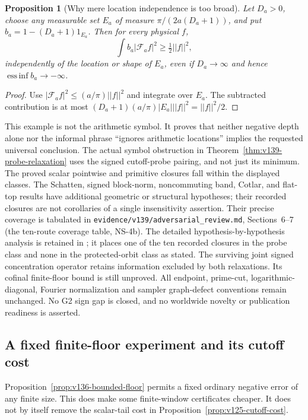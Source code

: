 \documentclass[11pt]{article}
\def\norm#1{||#1||}%
\newtheorem{proposition}[theorem]{Proposition}
\theoremstyle{remark}
\newcommand{\norm}[1]{\left\lVert #1\right\rVert}
\begin{document}
\begin{proposition}[Why mere location independence is too broad]
\label{prop:v139-location-counterexample}
Let $D_a>0$, choose any measurable set $E_a$ of measure
$\pi/(2a(D_a+1))$, and put
$b_a=1-(D_a+1)1_{E_a}$. Then for every physical $f$,
\[
 \int b_a|\mathcal F_af|^2\ge\tfrac12\norm f^2,
\]
independently of the location or shape of $E_a$, even if
$D_a\to\infty$ and hence $\operatorname*{ess\,inf}b_a\to-\infty$.
\end{proposition}
\begin{proof}
Use $|\mathcal F_af|^2\le(a/\pi)\norm f^2$ and integrate over
$E_a$. The subtracted contribution is at most
$(D_a+1)(a/\pi)|E_a|\norm f^2=\norm f^2/2$.
\end{proof}

This example is not the arithmetic symbol. It proves that neither
negative depth alone nor the informal phrase ``ignores arithmetic
locations'' implies the requested universal conclusion. The actual
symbol obstruction in Theorem~\ref{thm:v139-probe-relaxation} uses
the signed cutoff-probe pairing, and not just its minimum.
The proved scalar pointwise and primitive closures fall within the
displayed classes. The Schatten, signed block-norm, noncommuting
band, Cotlar, and flat-top results have additional geometric or
structural hypotheses; their recorded closures are not corollaries
of a single insensitivity assertion. Their precise coverage is
tabulated in \texttt{evidence/v139/adversarial\_review.md},
Sections~6--7 (the ten-route coverage table, NS-4b). The detailed
hypothesis-by-hypothesis analysis is retained in
; it places one of the
ten recorded closures in the probe class and none in the protected-orbit
class as stated. The surviving joint signed
concentration operator retains information excluded by both
relaxations. Its cofinal finite-floor bound is still unproved.
All endpoint, prime-cut, logarithmic-diagonal, Fourier normalization
and sampler graph-defect conventions remain unchanged. No G2 sign
gap is closed, and no worldwide novelty or publication readiness is
asserted.


\subsection{A fixed finite-floor experiment and its cutoff cost}

Proposition~\ref{prop:v136-bounded-floor} permits a fixed ordinary
negative error of any finite size. This does make some finite-window
certificates cheaper. It does not by itself remove the scalar-tail
cost in Proposition~\ref{prop:v125-cutoff-cost}.
\end{document}
